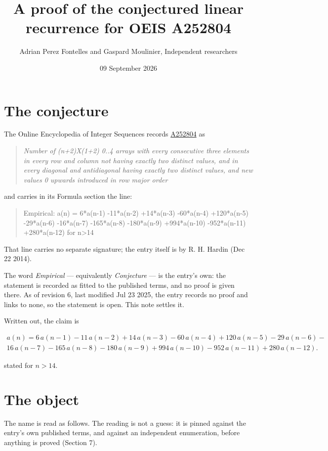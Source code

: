 \documentclass[11pt]{article}
\title{A proof of the conjectured linear recurrence for OEIS A252804}
\author{Adrian Perez Fontelles and Gaspard Moulinier, Independent researchers}
\date{09 September 2026}
\theoremstyle{definition}
\begin{document}
\maketitle
\section{The conjecture}

The Online Encyclopedia of Integer Sequences records \href{https://oeis.org/A252804}{A252804} as

\begin{quote}\itshape Number of (n+2)X(1+2) 0..4 arrays with every consecutive three elements in every row and column not having exactly two distinct values, and in every diagonal and antidiagonal having exactly two distinct values, and new values 0 upwards introduced in row major order\end{quote}

and carries in its Formula section the line:

\begin{quote}\ttfamily Empirical: a(n) = 6*a(n-1) -11*a(n-2) +14*a(n-3) -60*a(n-4) +120*a(n-5) -29*a(n-6) -16*a(n-7) -165*a(n-8) -180*a(n-9) +994*a(n-10) -952*a(n-11) +280*a(n-12) for n>14\end{quote}

That line carries no separate signature; the entry itself is by R. H. Hardin (Dec 22 2014).

The word {\itshape Empirical} --- equivalently {\itshape Conjecture} --- is the entry's own: the statement is recorded as fitted to the published terms, and no proof is given there. As of revision 6, last modified Jul 23 2025, the entry records no proof and links to none, so the statement is open. This note settles it.

Written out, the claim is

\begin{multline*} a(n) = 6\,a(n-1) - 11\,a(n-2) + 14\,a(n-3) - 60\,a(n-4) + 120\,a(n-5) - 29\,a(n-6) - \\ 16\,a(n-7) - 165\,a(n-8) - 180\,a(n-9) + 994\,a(n-10) - 952\,a(n-11) + 280\,a(n-12). \end{multline*}

stated for $n > 14$.

\section{The object}

The name is read as follows. The reading is not a guess: it is pinned against the entry's own published terms, and against an independent enumeration, before anything is proved (Section 7).
\end{document}
